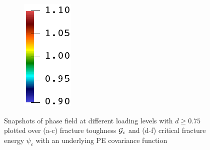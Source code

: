 \begin{figure}[!htbp]
\begin{subfigure}[b]{0.08\textwidth}
    \includegraphics[width=\textwidth]{Chapter4/figures/rainbow_vertical.png}
    \vspace{0.15in}
  \end{subfigure}
  \caption{Snapshots of phase field at different loading levels with $d \geqslant 0.75$ plotted over (a-c) fracture toughness ${\mathcal{G}_c}$ and (d-f) critical fracture energy $\psi_c$ with an underlying PE covariance function }
  \label{fig: Chapter4/2D/compare_sensitivity_exp}
\end{figure}
